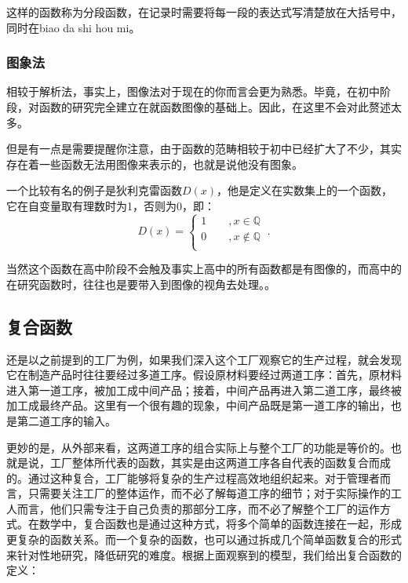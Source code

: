 这样的函数称为分段函数，在记录时需要将每一段的表达式写清楚放在大括号中，同时在biao da shi hou mi。

\subsubsection{图象法}

相较于解析法，事实上，图像法对于现在的你而言会更为熟悉。毕竟，在初中阶段，对函数的研究完全建立在就函数图像的基础上。因此，在这里不会对此赘述太多。

但是有一点是需要提醒你注意，由于函数的范畴相较于初中已经扩大了不少，其实存在着一些函数无法用图像来表示的，也就是说他没有图象。

一个比较有名的例子是狄利克雷函数$D(x)$，他是定义在实数集上的一个函数，它在自变量取有理数时为1，否则为0，即：
\begin{equation}
D(x)=\begin{cases}
1\qquad, x\in\mathbb{Q} \\
0\qquad, x\notin\mathbb{Q}  \\
\end{cases} ~.
\end{equation}



当然这个函数在高中阶段不会触及事实上高中的所有函数都是有图像的，而高中的在研究函数时，往往也是要带入到图像的视角去处理。。


\subsection{复合函数}

还是以之前提到的工厂为例，如果我们深入这个工厂观察它的生产过程，就会发现它在制造产品时往往要经过多道工序。假设原材料要经过两道工序：首先，原材料进入第一道工序，被加工成中间产品；接着，中间产品再进入第二道工序，最终被加工成最终产品。这里有一个很有趣的现象，中间产品既是第一道工序的输出，也是第二道工序的输入。

更妙的是，从外部来看，这两道工序的组合实际上与整个工厂的功能是等价的。也就是说，工厂整体所代表的函数，其实是由这两道工序各自代表的函数复合而成的。通过这种复合，工厂能够将复杂的生产过程高效地组织起来。对于管理者而言，只需要关注工厂的整体运作，而不必了解每道工序的细节；对于实际操作的工人而言，他们只需专注于自己负责的那部分工序，而不必了解整个工厂的运作方式。在数学中，复合函数也是通过这种方式，将多个简单的函数连接在一起，形成更复杂的函数关系。而一个复杂的函数，也可以通过拆成几个简单函数复合的形式来针对性地研究，降低研究的难度。根据上面观察到的模型，我们给出复合函数的定义：

